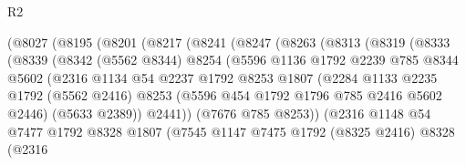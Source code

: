 \begin{lexlean}{R2}
\begin{coremodule}
                    (@8027
                      (@8195
                        (@8201
                          (@8217
                            (@8241
                              (@8247
                                (@8263
                                  (@8313
                                    (@8319
                                      (@8333
                                        (@8339
                                          (@8342
                                            (@5562 @8344)
                                            @8254
                                            (@5596
                                              @1136
                                              @1792
                                              @2239
                                              @785
                                              @8344
                                              @5602
                                              (@2316
                                                @1134
                                                @54
                                                @2237
                                                @1792
                                                @8253
                                                @1807
                                                (@2284
                                                  @1133
                                                  @2235
                                                  @1792
                                                  (@5562 @2416)
                                                  @8253
                                                  (@5596 @454 @1792 @1796 @785 @2416 @5602 @2446)
                                                  (@5633 @2389))
                                                @2441))
                                            (@7676 @785 @8253))
                                          (@2316
                                            @1148
                                            @54
                                            @7477
                                            @1792
                                            @8328
                                            @1807
                                            (@7545
                                              @1147
                                              @7475
                                              @1792
                                              (@8325 @2416)
                                              @8328
                                              (@2316

\end{coremodule}
\end{lexlean}
